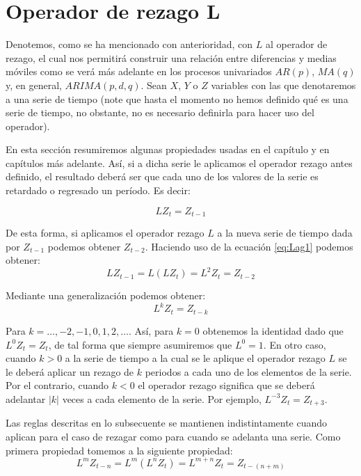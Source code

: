 \documentclass[
]{book}
\begin{document}
\hypertarget{operador-de-rezago-l}{%
\section{Operador de rezago L}\label{operador-de-rezago-l}}

Denotemos, como se ha mencionado con anterioridad, con \(L\) al operador de rezago, el cual nos permitirá construir una relación entre diferencias y medias móviles como se verá más adelante en los procesos univariados \(AR(p)\), \(MA(q)\) y, en general, \(ARIMA(p, d, q)\). Sean \(X\), \(Y\) o \(Z\) variables con las que denotaremos a una serie de tiempo (note que hasta el momento no hemos definido qué es una serie de tiempo, no obstante, no es necesario definirla para hacer uso del operador).

En esta sección resumiremos algunas propiedades usadas en el capítulo y en capítulos más adelante. Así, si a dicha serie le aplicamos el operador rezago antes definido, el resultado deberá ser que cada uno de los valores de la serie es retardado o regresado un período. Es decir:

\begin{equation}
    L Z_t = Z_{t-1}
    \label{eq:Lag1}
\end{equation}

De esta forma, si aplicamos el operador rezago \(L\) a la nueva serie de tiempo dada por \(Z_{t-1}\) podemos obtener \(Z_{t-2}\). Haciendo uso de la ecuación \eqref{eq:Lag1} podemos obtener:
\begin{equation}
    L Z_{t-1} = L(L Z_t) = L^2 Z_t = Z_{t-2}
    \label{eq:Lag2}
\end{equation}

Mediante una generalización podemos obtener:
\begin{equation}
    L^k Z_t = Z_{t-k}
    \label{eq:Lag3}
\end{equation}

Para \(k = \ldots, -2, -1, 0, 1, 2, \ldots\). Así, para \(k = 0\) obtenemos la identidad dado que \(L^0 Z_t = Z_t\), de tal forma que siempre asumiremos que \(L^0 = 1\). En otro caso, cuando \(k > 0\) a la serie de tiempo a la cual se le aplique el operador rezago \(L\) se le deberá aplicar un rezago de \(k\) periodos a cada uno de los elementos de la serie. Por el contrario, cuando \(k < 0\) el operador rezago significa que se deberá adelantar \(|k|\) veces a cada elemento de la serie. Por ejemplo, \(L^{-3} Z_t = Z_{t+3}\).

Las reglas descritas en lo subsecuente se mantienen indistintamente cuando aplican para el caso de rezagar como para cuando se adelanta una serie. Como primera propiedad tomemos a la siguiente propiedad:
\begin{equation}
    L^{m} Z_{t-n} = L^{m} (L^{n} Z_{t}) = L^{m + n} Z_{t} = Z_{t-(n + m)} 
    \label{eq:Lag4}
\end{equation}
\end{document}
